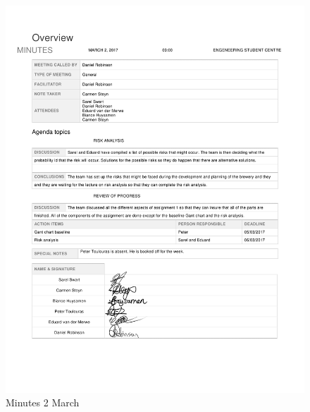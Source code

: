\begin{appendices}
\begin{figure}[H]
\centering
\includegraphics[scale=0.25]{Meeting_minutes_02_March.png}
\caption{Minutes 2 March}
\end{figure}


\end{appendices}
